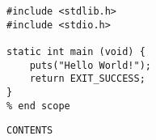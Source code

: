 % 

\begin{lstlisting}[frame=single, label={code:hello_world}, caption={A hello world snippet.}, xleftmargin=.15\textwidth, xrightmargin=.15\textwidth]
% Actual contents
#include <stdlib.h>
#include <stdio.h>

static int main (void) {
    puts("Hello World!");
    return EXIT_SUCCESS;
}
% end scope
\end{lstlisting}



\begin{lstlisting}[frame=single, label={code:FIX_ME_PLEASE}, caption={A descriptive caption.}, xleftmargin=.15\textwidth, xrightmargin=.15\textwidth]
    CONTENTS
\end{lstlisting}





